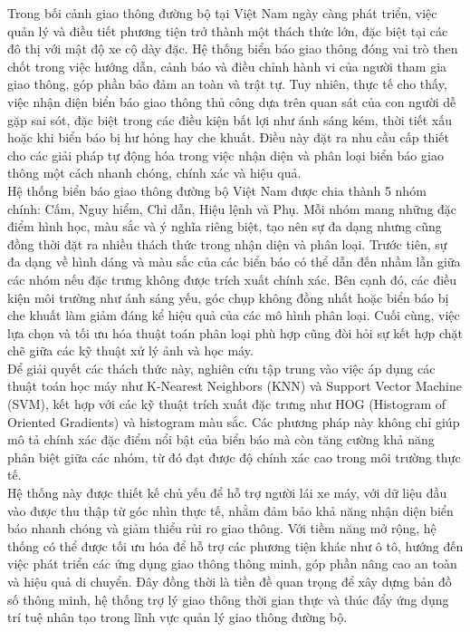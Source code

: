 \documentclass[a4paper,12pt]{article}
\begin{document}
Trong bối cảnh giao thông đường bộ tại Việt Nam ngày càng phát triển, việc quản lý và điều tiết phương tiện trở thành một thách thức lớn, đặc biệt tại các đô thị với mật độ xe cộ dày đặc. Hệ thống biển báo giao thông đóng vai trò then chốt trong việc hướng dẫn, cảnh báo và điều chỉnh hành vi của người tham gia giao thông, góp phần bảo đảm an toàn và trật tự. Tuy nhiên, thực tế cho thấy, việc nhận diện biển báo giao thông thủ công dựa trên quan sát của con người dễ gặp sai sót, đặc biệt trong các điều kiện bất lợi như ánh sáng kém, thời tiết xấu hoặc khi biển báo bị hư hỏng hay che khuất. Điều này đặt ra nhu cầu cấp thiết cho các giải pháp tự động hóa trong việc nhận diện và phân loại biển báo giao thông một cách nhanh chóng, chính xác và hiệu quả.\\[0.1cm]

Hệ thống biển báo giao thông đường bộ Việt Nam được chia thành 5 nhóm chính: Cấm, Nguy hiểm, Chỉ dẫn, Hiệu lệnh và Phụ. Mỗi nhóm mang những đặc điểm hình học, màu sắc và ý nghĩa riêng biệt, tạo nên sự đa dạng nhưng cũng đồng thời đặt ra nhiều thách thức trong nhận diện và phân loại. Trước tiên, sự đa dạng về hình dáng và màu sắc của các biển báo có thể dẫn đến nhầm lẫn giữa các nhóm nếu đặc trưng không được trích xuất chính xác. Bên cạnh đó, các điều kiện môi trường như ánh sáng yếu, góc chụp không đồng nhất hoặc biển báo bị che khuất làm giảm đáng kể hiệu quả của các mô hình phân loại. Cuối cùng, việc lựa chọn và tối ưu hóa thuật toán phân loại phù hợp cũng đòi hỏi sự kết hợp chặt chẽ giữa các kỹ thuật xử lý ảnh và học máy.\\[0.1cm]

Để giải quyết các thách thức này, nghiên cứu tập trung vào việc áp dụng các thuật toán học máy như K-Nearest Neighbors (KNN) và Support Vector Machine (SVM), kết hợp với các kỹ thuật trích xuất đặc trưng như HOG (Histogram of Oriented Gradients) và histogram màu sắc. Các phương pháp này không chỉ giúp mô tả chính xác đặc điểm nổi bật của biển báo mà còn tăng cường khả năng phân biệt giữa các nhóm, từ đó đạt được độ chính xác cao trong môi trường thực tế.\\[0.1cm]

Hệ thống này được thiết kế chủ yếu để hỗ trợ người lái xe máy, với dữ liệu đầu vào được thu thập từ góc nhìn thực tế, nhằm đảm bảo khả năng nhận diện biển báo nhanh chóng và giảm thiểu rủi ro giao thông. Với tiềm năng mở rộng, hệ thống có thể được tối ưu hóa để hỗ trợ các phương tiện khác như ô tô, hướng đến việc phát triển các ứng dụng giao thông thông minh, góp phần nâng cao an toàn và hiệu quả di chuyển. Đây đồng thời là tiền đề quan trọng để xây dựng bản đồ số thông minh, hệ thống trợ lý giao thông thời gian thực và thúc đẩy ứng dụng trí tuệ nhân tạo trong lĩnh vực quản lý giao thông đường bộ.
\end{document}
